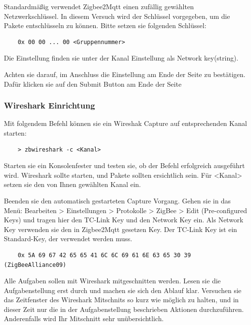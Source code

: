 Standardmäßig verwendet Zigbee2Mqtt einen zufällig gewählten Netzwerkschlüssel. In diesem Versuch wird der Schlüssel vorgegeben, um die Pakete
entschlüsseln zu können. Bitte setzen sie folgenden Schlüssel:

\begin{lstlisting}
    0x 00 00 ... 00 <Gruppennummer>
\end{lstlisting}

Die Einstellung finden sie unter der Kanal Einstellung als \grqq Network key(string)\grqq{}.

Achten sie darauf, im Anschluss die Einstellung am Ende der Seite zu bestätigen. Dafür klicken sie auf den 
\grqq Submit \grqq{} Button am Ende der Seite

\subsubsection{Wireshark Einrichtung}
Mit folgendem Befehl können sie ein Wireshak Capture auf entsprechenden Kanal starten:

\begin{lstlisting}
    > zbwireshark -c <Kanal>
\end{lstlisting}

Starten sie ein Konsolenfester und testen sie, ob der Befehl erfolgreich ausgeführt wird. Wireshark sollte starten, und Pakete sollten ersichtlich sein. Für \grqq 
<Kanal> \grqq{} setzen sie den von Ihnen gewählten Kanal ein.

Beenden sie den automatisch gestarteten Capture Vorgang. Gehen sie in das Menü: Bearbeiten > Einstellungen > Protokolle > ZigBee > Edit (Pre-configured Keys) und tragen
hier den \grqq TC-Link Key\grqq{} und den \grqq Network Key\grqq{} ein. Als \grqq Network Key\grqq{} verwenden sie den in Zigbee2Mqtt gesetzen Key. Der \grqq TC-Link Key\grqq{} ist ein
Standard-Key, der verwendet werden muss.
\begin{lstlisting}
    0x 5A 69 67 42 65 65 41 6C 6C 69 61 6E 63 65 30 39 (ZigBeeAlliance09)
\end{lstlisting}

\begin{Hinweis}
    Alle Aufgaben sollen mit Wireshark mitgeschnitten werden. Lesen sie die Aufgabenstellung erst durch und machen sie sich den Ablauf klar. Versuchen sie das 
    Zeitfenster des Wireshark Mitschnits so kurz wie möglich zu halten, und in dieser Zeit nur die in der Aufgabenstellung beschrieben Aktionen durchzuführen.
    Anderenfalls wird Ihr Mitschnitt sehr unübersichtlich.
\end{Hinweis}

